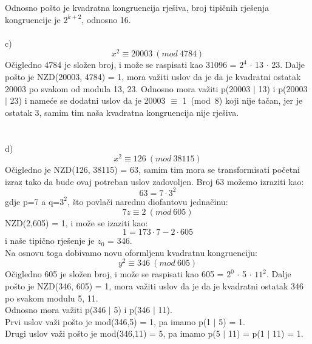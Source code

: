 \documentclass[12pt]{article}
\begin{document}
\begin{enumerate}
		Odnosno pošto je kvadratna kongruencija rješiva, broj tipičnih rješenja kongruencije je $2^{k+2}$, odnosno 16.
		\\
		\\
		c)
		\begin{equation*}
	       x^2 \equiv 20003~(mod~4784)
		\end{equation*}
		Očigledno 4784 je složen broj, i može se raspisati kao 31096 = $2^4$ ${\cdot}$ 13 ${\cdot}$ 23.
		Dalje pošto je NZD(20003, 4784) = 1, mora važiti uslov da je  da je kvadratni 
		ostatak 20003 po svakom od modula 13, 23.
		Odnosno mora važiti p(20003 $\mid$ 13) i p(20003 $\mid$ 23) i nameće se dodatni uslov da je  
		20003 ${\equiv}$ 1~(mod~8) koji nije tačan, jer je ostatak 3, samim tim naša kvadratna kongruencija nije rješiva. \\
		\\
		\\
		d)
		\begin{equation*}
	       x^2 \equiv 126~(mod~38115)
		\end{equation*}
		Očigledno je NZD(126, 38115) = 63, samim tim mora se transformisati početni izraz tako da bude ovaj potreban uslov 
		zadovoljen. Broj 63 možemo izraziti kao:
		\begin{equation*}
	       63 = 7 \cdot 3^2
		\end{equation*}
		gdje p=7 a q=$3^2$, što povlači narednu diofantovu jednačinu:
		\begin{equation*}
	      7z \equiv 2~(mod~605)
		\end{equation*}
		NZD(2,605) = 1, i može se izaziti kao:
		\begin{equation*}
	      1 = 173 \cdot 7 - 2 \cdot 605
		\end{equation*}
		i naše tipično rješenje je $z_{0}$ = 346. \\
		Na osnovu toga dobivamo novu oformljenu kvadratnu kongruenciju:
		\begin{equation*}
	      y^2 \equiv 346~(mod~605)
		\end{equation*}
		Očigledno 605 je složen broj, i može se raspisati kao 605 = $2^0$ ${\cdot}$ 5 ${\cdot}$ $11^2$.
		Dalje pošto je NZD(346, 605) = 1, mora važiti uslov da je  da je kvadratni 
		ostatak 346 po svakom modulu 5, 11. \\
		Odnosno mora važiti p(346 $\mid$ 5) i p(346 $\mid$ 11). \\
		Prvi uslov važi pošto je mod(346,5) = 1, pa imamo p(1 $\mid$ 5) = 1. \\
		Drugi uslov važi pošto je mod(346,11) = 5, pa imamo p(5 $\mid$ 11) = p(1 $\mid$ 11) = 1. \\

\end{enumerate}
\end{document}

